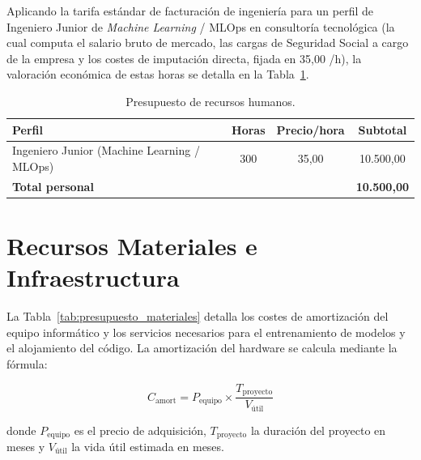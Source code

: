 Aplicando la tarifa estándar de facturación de ingeniería para un perfil de Ingeniero Junior de \textit{Machine Learning} / MLOps en consultoría tecnológica (la cual computa el salario bruto de mercado, las cargas de Seguridad Social a cargo de la empresa y los costes de imputación directa, fijada en 35,00 \texteuro{}/h), la valoración económica de estas horas se detalla en la Tabla~\ref{tab:presupuesto_personal}.

\begin{table}[htbp]
\centering
\small
\begin{tabular}{@{}>{\raggedright\arraybackslash}p{}ccc@{}}
\toprule
\textbf{Perfil} & \textbf{Horas} & \textbf{Precio/hora} & \textbf{Subtotal} \\
\midrule
Ingeniero Junior (Machine Learning / MLOps) & 300 & 35,00 \texteuro{} & 10.500,00 \texteuro{} \\
\midrule
\textbf{Total personal} & & & \textbf{10.500,00 \texteuro{}} \\
\bottomrule
\end{tabular}
\caption{Presupuesto de recursos humanos.}
\label{tab:presupuesto_personal}
\end{table}

\section{Recursos Materiales e Infraestructura}

La Tabla~\ref{tab:presupuesto_materiales} detalla los costes de amortización del equipo informático y los servicios necesarios para el entrenamiento de modelos y el alojamiento del código. La amortización del hardware se calcula mediante la fórmula:

\begin{equation}
    C_{\text{amort}} = P_{\text{equipo}} \times \frac{T_{\text{proyecto}}}{V_{\text{útil}}}
\end{equation}

donde $P_{\text{equipo}}$ es el precio de adquisición, $T_{\text{proyecto}}$ la duración del proyecto en meses y $V_{\text{útil}}$ la vida útil estimada en meses.

